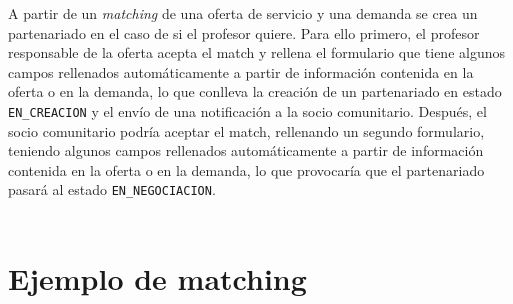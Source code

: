 \documentclass[11pt]{book}
\begin{document}
A partir de un \emph{matching} de una oferta de servicio y una demanda se crea un partenariado en el caso de si el profesor quiere. Para ello primero, el profesor responsable de la oferta acepta el match y rellena el formulario que tiene  algunos campos rellenados automáticamente a partir de información contenida en la oferta o en la demanda, lo que conlleva la creación de un partenariado en estado \texttt{EN\_CREACION} y el envío de una notificación a la socio comunitario. Después, el socio comunitario podría aceptar el match, rellenando un segundo formulario, teniendo algunos campos rellenados automáticamente a partir de información contenida en la oferta o en la demanda, lo que provocaría que el partenariado pasará al estado \texttt{EN\_NEGOCIACION}.\\\\

\section{Ejemplo de matching}
\end{document}
